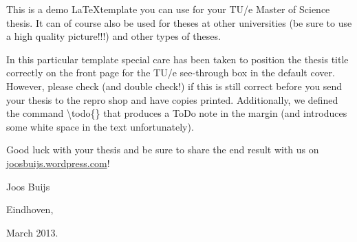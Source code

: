 This is a demo \LaTeX template you can use for your TU/e Master of Science thesis. It can of course also be used for theses at other universities (be sure to use a high quality picture!!!) and other types of theses.

In this particular template special care has been taken to position the thesis title correctly on the front page for the TU/e see-through box in the default cover. However, please check (and double check!) if this is still correct before you send your thesis to the repro shop and have copies printed. Additionally, we defined the command \textbackslash todo\{\} that produces a  ToDo note in the margin (and introduces some white space in the text unfortunately).

Good luck with your thesis and be sure to share the end result with us on \url{joosbuijs.wordpress.com}!

\vspace{10pt}

Joos Buijs

Eindhoven,

March 2013.